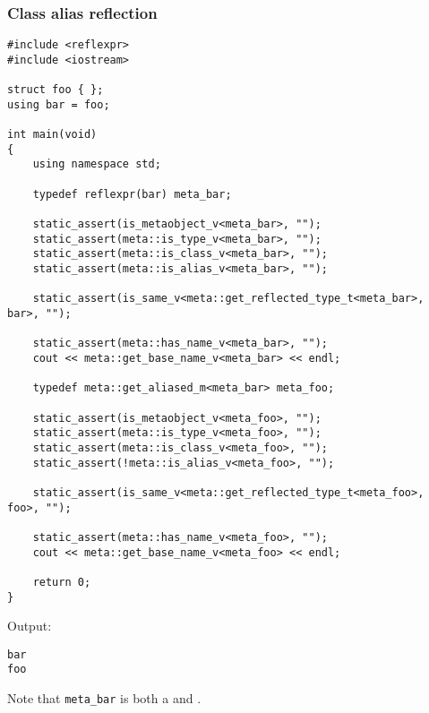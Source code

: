 \subsubsection{Class alias reflection}

\begin{verbatim}
#include <reflexpr>
#include <iostream>

struct foo { };
using bar = foo;

int main(void)
{
	using namespace std;

	typedef reflexpr(bar) meta_bar;

	static_assert(is_metaobject_v<meta_bar>, "");
	static_assert(meta::is_type_v<meta_bar>, "");
	static_assert(meta::is_class_v<meta_bar>, "");
	static_assert(meta::is_alias_v<meta_bar>, "");

	static_assert(is_same_v<meta::get_reflected_type_t<meta_bar>, bar>, "");

	static_assert(meta::has_name_v<meta_bar>, "");
	cout << meta::get_base_name_v<meta_bar> << endl;

	typedef meta::get_aliased_m<meta_bar> meta_foo;

	static_assert(is_metaobject_v<meta_foo>, "");
	static_assert(meta::is_type_v<meta_foo>, "");
	static_assert(meta::is_class_v<meta_foo>, "");
	static_assert(!meta::is_alias_v<meta_foo>, "");

	static_assert(is_same_v<meta::get_reflected_type_t<meta_foo>, foo>, "");

	static_assert(meta::has_name_v<meta_foo>, "");
	cout << meta::get_base_name_v<meta_foo> << endl;

	return 0;
}
\end{verbatim}

Output:

\begin{verbatim}
bar
foo
\end{verbatim}

Note that \texttt{meta\_bar} is both a  and .


